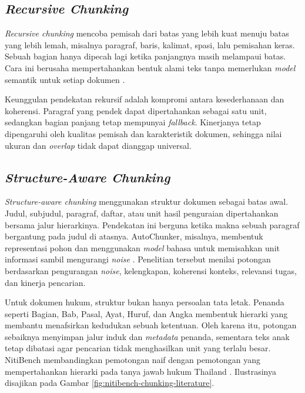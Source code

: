 \subsection{\emph{Recursive Chunking}}

\emph{Recursive chunking} mencoba pemisah dari batas yang lebih kuat menuju batas yang lebih lemah, misalnya paragraf, baris, kalimat, spasi, lalu pemisahan keras. Sebuah bagian hanya dipecah lagi ketika panjangnya masih melampaui batas. Cara ini berusaha mempertahankan bentuk alami teks tanpa memerlukan \emph{model} semantik untuk setiap dokumen \parencite{narimissaExploringInformationRetrieval2024}.

Keunggulan pendekatan rekursif adalah kompromi antara kesederhanaan dan koherensi. Paragraf yang pendek dapat dipertahankan sebagai satu unit, sedangkan bagian panjang tetap mempunyai \emph{fallback}. Kinerjanya tetap dipengaruhi oleh kualitas pemisah dan karakteristik dokumen, sehingga nilai ukuran dan \emph{overlap} tidak dapat dianggap universal.

\subsection{\emph{Structure-Aware Chunking}}

\emph{Structure-aware chunking} menggunakan struktur dokumen sebagai batas awal. Judul, subjudul, paragraf, daftar, atau unit hasil penguraian dipertahankan bersama jalur hierarkinya. Pendekatan ini berguna ketika makna sebuah paragraf bergantung pada judul di atasnya. AutoChunker, misalnya, membentuk representasi pohon dan menggunakan \emph{model} bahasa untuk memisahkan unit informasi sambil mengurangi \emph{noise} \parencite{jainAutoChunker2025}. Penelitian tersebut menilai potongan berdasarkan pengurangan \emph{noise}, kelengkapan, koherensi konteks, relevansi tugas, dan kinerja pencarian.

Untuk dokumen hukum, struktur bukan hanya persoalan tata letak. Penanda seperti Bagian, Bab, Pasal, Ayat, Huruf, dan Angka membentuk hierarki yang membantu menafsirkan kedudukan sebuah ketentuan. Oleh karena itu, potongan sebaiknya menyimpan jalur induk dan \emph{metadata} penanda, sementara teks anak tetap dibatasi agar pencarian tidak menghasilkan unit yang terlalu besar. NitiBench membandingkan pemotongan naif dengan pemotongan yang mempertahankan hierarki pada tanya jawab hukum Thailand \parencite{akarajaradwongNitiBenchComprehensiveStudy2025}. Ilustrasinya disajikan pada Gambar \ref{fig:nitibench-chunking-literature}.

